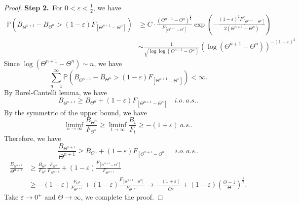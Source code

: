 \documentclass[11pt]{article}
\theoremstyle{definition}
\begin{document}
\begin{proof}
{\bf Step 2.}\ For $0<\varepsilon<\frac{1}{2}$, we have
\begin{equation*}
  \begin{aligned}
    \mathbb{P}\left( B_{\Theta^{n+1}}-B_{\Theta^{n}}> (1-\varepsilon)F_{[\Theta^{n+1}-\Theta^n]}\right) & \ge C\cdot \frac{(\Theta^{n+1}-\Theta^n)^\frac{1}{2}}{F_{[\Theta^{n+1}-\Theta^n]}} \exp\left( -\frac{(1-\varepsilon)^2 F^2_{[\Theta^{n+1}-\Theta^{n}]}}{2(\Theta^{n+1}-\Theta^n)} \right)\\
&\sim \frac{1}{\sqrt{\log \log (\Theta^{n+1}-\Theta^n)}}\left(\log (\Theta^{n+1}-\Theta^n)\right)^{-(1-\varepsilon)^2}
  \end{aligned}
\end{equation*}
Since $\log(\Theta^{n+1}-\Theta^n)\sim n$, we have 
\[
\sum^\infty_{n=1}\mathbb{P}\left( B_{\Theta^{n+1}}-B_{\Theta^{n}}> (1-\varepsilon)F_{[\Theta^{n+1}-\Theta^n]}\right)<\infty.
\]
By Borel-Cantelli lemma, we have 
\[
B_{\Theta^{n+1}}\ge B_{\Theta^n}+(1-\varepsilon) F_{[\Theta^{n+1}-\Theta^n]} \quad i.o. \ a.s..
\]
By the symmetric of the upper bound, we have
\[
\liminf_{n\rightarrow \infty} \frac{B_{\Theta^n}}{F_{\Theta^n}}\ge \liminf_{t \rightarrow \infty} \frac{B_{t}}{F_{t}}\ge -(1+\varepsilon)\ a.s..
\]
Therefore, we have
\[
\frac{B_{\Theta^{n+1}}}{\Theta^{n+1}}\ge B_{\Theta^n}+(1-\varepsilon) F_{[\Theta^{n+1}-\Theta^n]} \quad i.o. \ a.s..
\]
\begin{equation*}
  \begin{aligned}
 \frac{B_{\Theta^{n+1}}}{\Theta^{n+1}} &\ge \frac{B_{\Theta^n}}{F_{\Theta^n}}\frac{F_{\Theta^n}}{F_{\Theta^{n+1}}}+(1-\varepsilon)\frac{F_{[\Theta^{n+1}-\Theta^n]}}{F_{\Theta^{n+1}}}\\ 
&\ge -(1+\varepsilon) \frac{F_{\Theta^n}}{F_{\Theta^{n+1}}}+(1-\varepsilon)\frac{F_{[\Theta^{n+1}-\Theta^n]}}{F_{\Theta^{n+1}}}\rightarrow -\frac{(1+\varepsilon)}{\Theta^\frac{1}{2}}+(1-\varepsilon)\left( \frac{\Theta-1}{\Theta} \right)^\frac{1}{2}.
  \end{aligned}
\end{equation*}
Take $\varepsilon \rightarrow 0^+$ and $\Theta \rightarrow \infty$, we complete the proof.
\end{proof}





\end{document}

